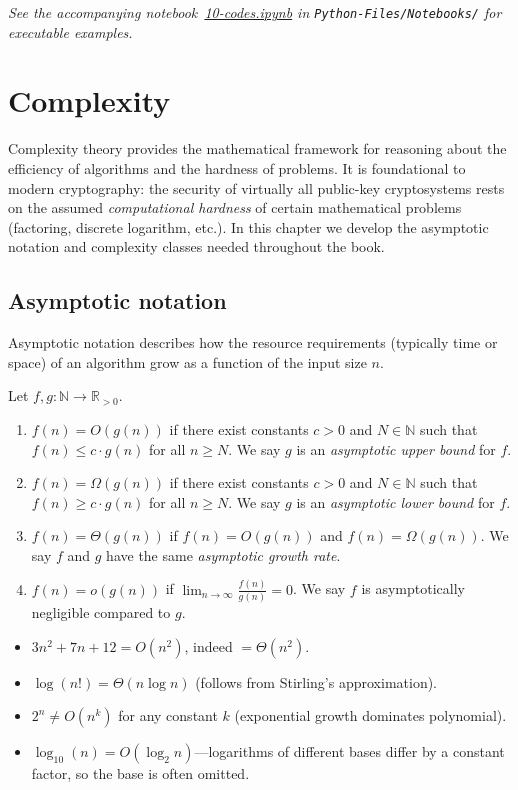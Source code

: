 \documentclass[a4paper, 12pt]{book} %
\newcommand{\notebook}[1]{\begingroup\small\itshape
    See the accompanying notebook~\href{run:./Python-Files/Notebooks/#1}{#1} in \texttt{Python-Files/Notebooks/} for executable examples.%
\endgroup}
\begin{document}
\notebook{10-codes.ipynb}

\chapter{Complexity}
\label{ch:complexity}

Complexity theory provides the mathematical framework for reasoning about the
efficiency of algorithms and the hardness of problems. It is foundational to
modern cryptography: the security of virtually all public-key cryptosystems
rests on the assumed \emph{computational hardness} of certain mathematical
problems (factoring, discrete logarithm, etc.). In this chapter we develop the
asymptotic notation and complexity classes needed throughout the book.

\section{Asymptotic notation}

Asymptotic notation describes how the resource requirements (typically time or
space) of an algorithm grow as a function of the input size $n$.

\begin{definition}
    Let $f, g: \mathbb{N} \longrightarrow \mathbb{R}_{>0}$.
    \begin{enumerate}
        \item $f(n) = O(g(n))$ if there exist constants $c > 0$ and $N \in \mathbb{N}$ such that $f(n) \leq c \cdot g(n)$ for all $n \geq N$. We say $g$ is an \emph{asymptotic upper bound} for $f$.
        \item $f(n) = \Omega(g(n))$ if there exist constants $c > 0$ and $N \in \mathbb{N}$ such that $f(n) \geq c \cdot g(n)$ for all $n \geq N$. We say $g$ is an \emph{asymptotic lower bound} for $f$.
        \item $f(n) = \Theta(g(n))$ if $f(n) = O(g(n))$ and $f(n) = \Omega(g(n))$. We say $f$ and $g$ have the same \emph{asymptotic growth rate}.
        \item $f(n) = o(g(n))$ if $\lim_{n \to \infty} \frac{f(n)}{g(n)} = 0$. We say $f$ is asymptotically negligible compared to $g$.
    \end{enumerate}
\end{definition}

\begin{example}
    \begin{itemize}
        \item $3n^2 + 7n + 12 = O(n^2)$, indeed $= \Theta(n^2)$.
        \item $\log(n!) = \Theta(n \log n)$ (follows from Stirling's approximation).
        \item $2^n \neq O(n^k)$ for any constant $k$ (exponential growth dominates polynomial).
        \item $\log_{10}(n) = O(\log_2 n)$---logarithms of different bases differ by a constant factor, so the base is often omitted.
    \end{itemize}
\end{example}
\end{document}
